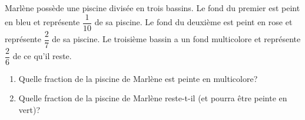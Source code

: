 %
%
    Marlène possède une piscine divisée en trois bassins. Le fond du premier est peint en bleu et représente $\dfrac{1}{10}$ de sa piscine. Le fond du deuxième est peint en rose et représente $\dfrac{2}{7}$ de sa piscine. Le troisième bassin a un fond multicolore et représente $\dfrac{2}{6}$ de ce qu'il reste.
    \begin{enumerate}
        \item Quelle fraction de la piscine de Marlène est peinte en multicolore?
        \item Quelle fraction de la piscine de Marlène reste-t-il (et pourra être peinte en vert)?
    \end{enumerate}
